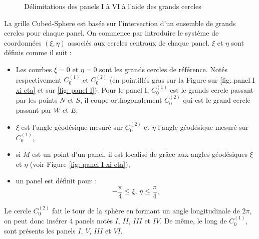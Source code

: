 \begin{figure}[ht]
\begin{center}


\end{center}
\caption{Délimitations des panels I à VI à l'aide des grands cercles}
\label{fig: panel I to VI}
\end{figure}

La grille Cubed-Sphere est basée sur l'intersection d'un ensemble de grands cercles pour chaque panel. On commence par introduire le système de coordonnées $(\xi,\eta)$ associés aux cercles centraux de chaque panel. $\xi$ et  $\eta$ sont définis comme il suit :

\begin{itemize}
\item Les courbes $\xi = 0$ et $\eta = 0$ sont les grands cercles de référence. Notés respectivement $C_0^{(1)}$ et $C_0^{(2)}$ (en pointillés gras sur la Figure sur \ref{fig: panel I xi eta} et sur \ref{fig: panel I}). Pour le panel I, $C_0^{(1)}$ est le grands cercle passant par les points $N$ et $S$, il coupe orthogonalement $C_0^{(2)}$ qui est le grand cercle passant par $W$ et $E$,

\item $\xi$ est l'angle géodésique mesuré sur $C_0^{(2)}$ et $\eta$ l'angle géodésique mesuré sur $C_0^{(1)}$,

\item si $M$ est un point d'un panel, il est localisé de grâce aux angles géodésiques $\xi$ et $\eta$  (voir Figure \ref{fig: panel I xi eta}),

\item un panel est définit pour :
\begin{equation}
- \dfrac{\pi}{4} \leq \xi\text{, }\eta \leq \dfrac{\pi}{4},
\end{equation}
\end{itemize}

Le cercle $C_0^{(2)}$ fait le tour de la sphère en formant un angle longitudinale de $2 \pi$, on peut donc insérer 4 panels notés $I$, $II$, $III$ et $IV$. De même, le long de $C_0^{(1)}$, sont présents les panels $I$, $V$, $III$ et $VI$.

    

